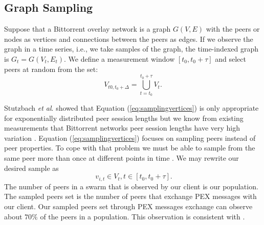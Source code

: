 \documentclass[paper]{ieice}
\begin{document}
\subsection{Graph Sampling}

Suppose that a Bittorrent overlay network is a graph $G(V,E)$ with the peers or nodes as vertices and connections between the peers as edges. 
If we observe the graph in a time series,  i.e., we take samples of the graph, the time-indexed graph is $G_t = G(V_t,E_t)$.   
We define a measurement window $[t_0,t_0 + \tau]$ and select peers at random from the set:
 \begin{equation}
V_{t0,t_0+\Delta} = \bigcup_{t=t_0}^{t_0+\tau} V_t.
 \label{eq:samplingvertices}
 \end{equation}

Stutzbach \textit{et al}. \cite{stutzbach2007sampling} showed that  Equation (\ref{eq:samplingvertices}) is only appropriate for exponentially distributed  peer session lengths but we know from existing measurements that Bittorrent networks peer session lengths have very high variation \cite{guo2005measurements}.  
Equation (\ref{eq:samplingvertices}) focuses on sampling peers instead of peer properties. 
To cope with that problem we must be able to sample from the same peer more than once at different points in time \cite{stutzbach2007sampling}. 
We may rewrite our desired sample as
\begin{equation}
\ v_{i,t} \in V_t  , t \in [t_0, t_0 + \tau].
\label{eq:samplingvertices2}
\end{equation}
The number of peers in a swarm that is observed by our client is our population. 
The sampled peers set is the number of peers that exchange PEX messages with our client.
Our sampled peers set through PEX messages exchange can observe about $70\%$ of the peers in a population.
This observation is consistent with \cite{wu2010understanding}.

\end{document}

